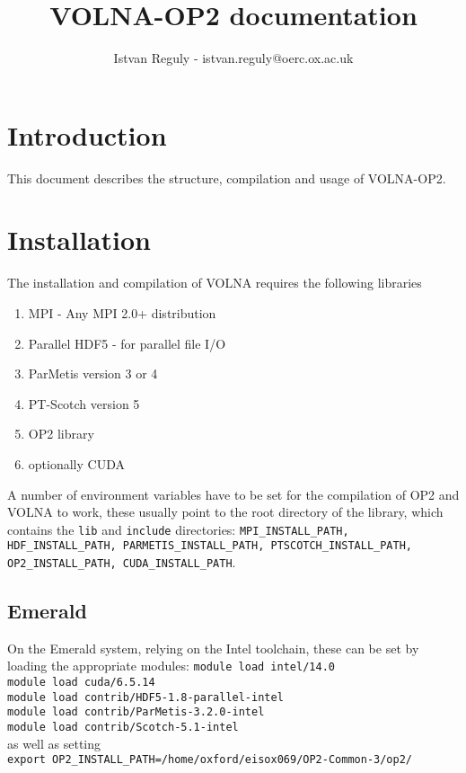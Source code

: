 \documentclass[11pt]{article}
\begin{document}
\title{VOLNA-OP2 documentation}
\author{Istvan Reguly - istvan.reguly@oerc.ox.ac.uk}
\maketitle
\section{Introduction}
This document describes the structure, compilation and usage of VOLNA-OP2.

\section{Installation}
The installation and compilation of VOLNA requires the following libraries
\begin{enumerate}
\item MPI - Any MPI 2.0+ distribution
\item Parallel HDF5 - for parallel file I/O
\item ParMetis version 3 or 4
\item PT-Scotch version 5
\item OP2 library
\item optionally CUDA
\end{enumerate}
A number of environment variables have to be set for the compilation of OP2 and VOLNA to work, these usually point to the root directory of the library, which contains the \texttt{lib} and \texttt{include} directories: \texttt{MPI\_INSTALL\_PATH, HDF\_INSTALL\_PATH, PARMETIS\_INSTALL\_PATH, PTSCOTCH\_INSTALL\_PATH, \\ OP2\_INSTALL\_PATH, CUDA\_INSTALL\_PATH}.

\subsection{Emerald}
On the Emerald system, relying on the Intel toolchain, these can be set by loading the appropriate modules:
\texttt{module load intel/14.0}\\
\texttt{module load cuda/6.5.14}\\
\texttt{module load contrib/HDF5-1.8-parallel-intel}\\
\texttt{module load contrib/ParMetis-3.2.0-intel}\\
\texttt{module load contrib/Scotch-5.1-intel}\\
as well as setting \\ \texttt{export OP2\_INSTALL\_PATH=/home/oxford/eisox069/OP2-Common-3/op2/}
\end{document}
